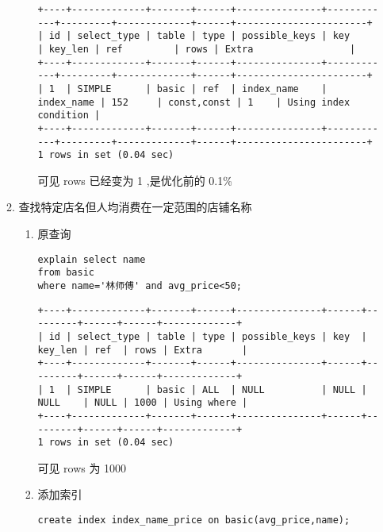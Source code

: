 \documentclass[11pt]{article}
\begin{document}
\begin{itemize}
\begin{enumerate}
\begin{enumerate}
\begin{verbatim}
+----+-------------+-------+------+---------------+------------+---------+-------------+------+-----------------------+
| id | select_type | table | type | possible_keys | key        | key_len | ref         | rows | Extra                 |
+----+-------------+-------+------+---------------+------------+---------+-------------+------+-----------------------+
| 1  | SIMPLE      | basic | ref  | index_name    | index_name | 152     | const,const | 1    | Using index condition |
+----+-------------+-------+------+---------------+------------+---------+-------------+------+-----------------------+
1 rows in set (0.04 sec)
\end{verbatim}

可见 rows 已经变为 1 ,是优化前的 0.1\%
\end{enumerate}

\item 查找特定店名但人均消费在一定范围的店铺名称
\begin{enumerate}
\item 原查询

\begin{lstlisting}
explain select name
from basic
where name='林师傅' and avg_price<50;
\end{lstlisting}

\begin{verbatim}
+----+-------------+-------+------+---------------+------+---------+------+------+-------------+
| id | select_type | table | type | possible_keys | key  | key_len | ref  | rows | Extra       |
+----+-------------+-------+------+---------------+------+---------+------+------+-------------+
| 1  | SIMPLE      | basic | ALL  | NULL          | NULL | NULL    | NULL | 1000 | Using where |
+----+-------------+-------+------+---------------+------+---------+------+------+-------------+
1 rows in set (0.04 sec)
\end{verbatim}

可见 rows 为 1000

\item 添加索引

\begin{lstlisting}
create index index_name_price on basic(avg_price,name);
\end{lstlisting}


\end{enumerate}
\end{enumerate}
\end{itemize}
\end{document}
